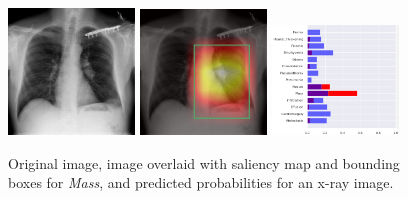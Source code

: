 \documentclass[12pt,oneside,a4paper]{report}
\begin{document}
\begin{figure}[H]
  \centering
  \includegraphics[width=0.3\textwidth]{images/preds/mass}\hspace{0.01\textwidth}%
  \includegraphics[width=0.3\textwidth]{images/preds/mass_cam}\hspace{0.01\textwidth}%
  \includegraphics[width=0.3\textwidth]{images/preds/mass_probs}\\[0.01\textwidth]
  \caption{Original image, image overlaid with saliency map and bounding boxes
    for \emph{Mass}, and predicted probabilities for an x-ray image.}
  \label{examples_5}
\end{figure}
\end{document}
